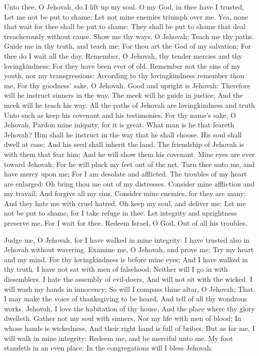 Unto thee, O Jehovah, do I lift up my soul.  O my God, in thee have I trusted, Let me not be put to shame; Let not mine enemies triumph over me.  Yea, none that wait for thee shall be put to shame: They shall be put to shame that deal treacherously without cause.  Show me thy ways, O Jehovah; Teach me thy paths.  Guide me in thy truth, and teach me; For thou art the God of my salvation; For thee do I wait all the day.  Remember, O Jehovah, thy tender mercies and thy lovingkindness; For they have been ever of old.  Remember not the sins of my youth, nor my transgressions: According to thy lovingkindness remember thou me, For thy goodness’ sake, O Jehovah.  Good and upright is Jehovah: Therefore will he instruct sinners in the way.  The meek will he guide in justice; And the meek will he teach his way.  All the paths of Jehovah are lovingkindness and truth Unto such as keep his covenant and his testimonies.  For thy name’s sake, O Jehovah, Pardon mine iniquity, for it is great.  What man is he that feareth Jehovah? Him shall he instruct in the way that he shall choose.  His soul shall dwell at ease; And his seed shall inherit the land.  The friendship of Jehovah is with them that fear him; And he will show them his covenant.  Mine eyes are ever toward Jehovah; For he will pluck my feet out of the net.  Turn thee unto me, and have mercy upon me; For I am desolate and afflicted.  The troubles of my heart are enlarged: Oh bring thou me out of my distresses.  Consider mine affliction and my travail; And forgive all my sins.  Consider mine enemies, for they are many; And they hate me with cruel hatred.  Oh keep my soul, and deliver me: Let me not be put to shame, for I take refuge in thee.  Let integrity and uprightness preserve me, For I wait for thee.  Redeem Israel, O God, Out of all his troubles. 

Judge me, O Jehovah, for I have walked in mine integrity: I have trusted also in Jehovah without wavering.  Examine me, O Jehovah, and prove me; Try my heart and my mind.  For thy lovingkindness is before mine eyes; And I have walked in thy truth.  I have not sat with men of falsehood; Neither will I go in with dissemblers.  I hate the assembly of evil-doers, And will not sit with the wicked.  I will wash my hands in innocency: So will I compass thine altar, O Jehovah;  That I may make the voice of thanksgiving to be heard, And tell of all thy wondrous works.  Jehovah, I love the habitation of thy house, And the place where thy glory dwelleth.  Gather not my soul with sinners, Nor my life with men of blood;  In whose hands is wickedness, And their right hand is full of bribes.  But as for me, I will walk in mine integrity: Redeem me, and be merciful unto me.  My foot standeth in an even place: In the congregations will I bless Jehovah. 

